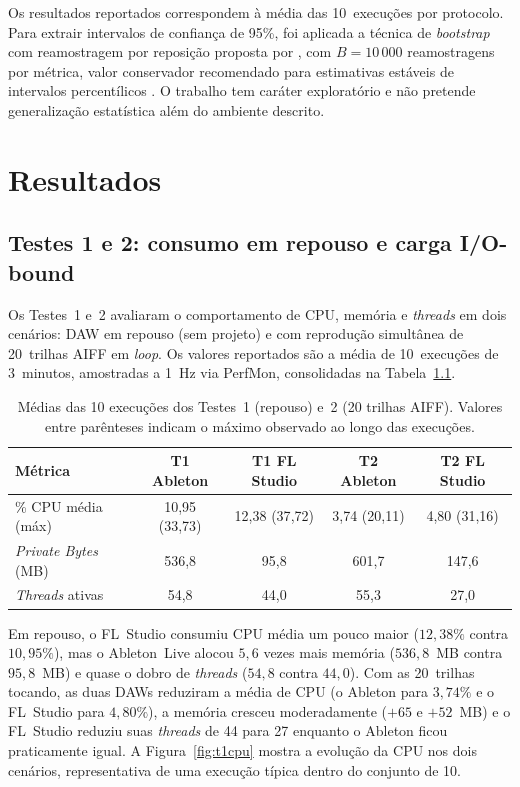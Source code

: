 \documentclass[tcc1]{classe_uftex/uftex}
\begin{document}
Os resultados reportados correspondem à média das 10~execuções por
protocolo. Para extrair intervalos de confiança de 95\%, foi aplicada
a técnica de \textit{bootstrap} com reamostragem por reposição
proposta por , com $B = 10\,000$ reamostragens
por métrica, valor conservador recomendado para estimativas estáveis
de intervalos percentílicos \cite{jain1991}. O trabalho tem caráter
exploratório e não pretende generalização estatística além do
ambiente descrito.


\chapter{Resultados}

\section{Testes 1 e 2: consumo em repouso e carga I/O-bound}

Os Testes~1 e~2 avaliaram o comportamento de CPU, memória e
\textit{threads} em dois cenários: DAW em repouso (sem projeto) e com
reprodução simultânea de 20~trilhas AIFF em \textit{loop}. Os valores
reportados são a média de 10~execuções de 3~minutos, amostradas a
1~Hz via PerfMon, consolidadas na Tabela~\ref{tab:t1}.

\begin{table}[ht]
\centering
\small
\caption{\small Médias das 10 execuções dos Testes~1 (repouso) e~2
(20 trilhas AIFF). Valores entre parênteses indicam o máximo
observado ao longo das execuções.}
\label{tab:t1}
\begin{tabular}{lcccc}
\toprule
\textbf{Métrica} & \textbf{T1 Ableton} & \textbf{T1 FL Studio}
                 & \textbf{T2 Ableton} & \textbf{T2 FL Studio} \\
\midrule
\% CPU média (máx)          & 10{,}95 (33{,}73) & 12{,}38 (37{,}72)
                             &  3{,}74 (20{,}11) &  4{,}80 (31{,}16) \\
\textit{Private Bytes} (MB) & 536{,}8 & 95{,}8 & 601{,}7 & 147{,}6 \\
\textit{Threads} ativas     &  54{,}8 & 44{,}0 &  55{,}3 &  27{,}0 \\
\bottomrule
\end{tabular}
\end{table}

Em repouso, o FL~Studio consumiu CPU média um pouco maior
($12{,}38\%$ contra $10{,}95\%$), mas o Ableton~Live alocou $5{,}6$
vezes mais memória ($536{,}8$~MB contra $95{,}8$~MB) e quase o dobro de
\textit{threads} ($54{,}8$ contra $44{,}0$). Com as 20~trilhas tocando,
as duas DAWs reduziram a média de CPU (o Ableton para $3{,}74\%$ e o
FL~Studio para $4{,}80\%$), a memória cresceu moderadamente ($+65$ e
$+52$~MB) e o FL~Studio reduziu suas \textit{threads} de 44 para 27
enquanto o Ableton ficou praticamente igual. A Figura~\ref{fig:t1cpu}
mostra a evolução da CPU nos dois cenários, representativa de uma
execução típica dentro do conjunto de 10.
\end{document}
